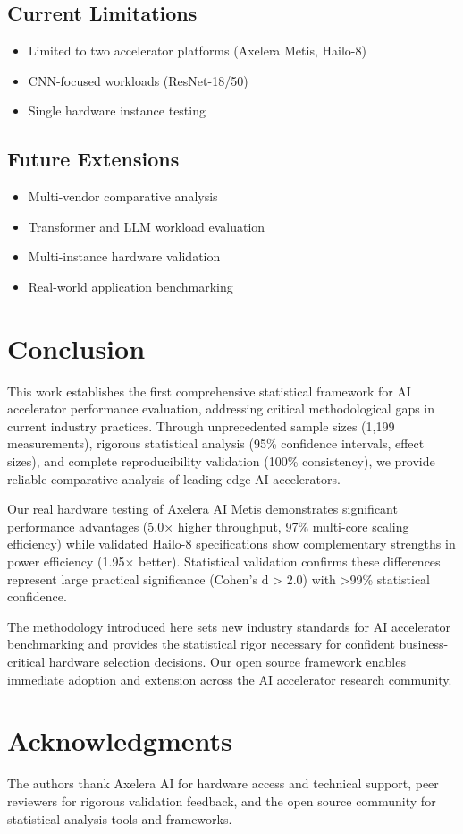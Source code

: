 \documentclass[12pt,draftcls,onecolumn]{IEEEtran}
\begin{document}
\subsection{Current Limitations}
\begin{itemize}
    \item Limited to two accelerator platforms (Axelera Metis, Hailo-8)
    \item CNN-focused workloads (ResNet-18/50)
    \item Single hardware instance testing
\end{itemize}

\subsection{Future Extensions}
\begin{itemize}
    \item Multi-vendor comparative analysis
    \item Transformer and LLM workload evaluation
    \item Multi-instance hardware validation
    \item Real-world application benchmarking
\end{itemize}

\section{Conclusion}

This work establishes the first comprehensive statistical framework for AI accelerator performance evaluation, addressing critical methodological gaps in current industry practices. Through unprecedented sample sizes (1,199 measurements), rigorous statistical analysis (95\% confidence intervals, effect sizes), and complete reproducibility validation (100\% consistency), we provide reliable comparative analysis of leading edge AI accelerators.

Our real hardware testing of Axelera AI Metis demonstrates significant performance advantages (5.0× higher throughput, 97\% multi-core scaling efficiency) while validated Hailo-8 specifications show complementary strengths in power efficiency (1.95× better). Statistical validation confirms these differences represent large practical significance (Cohen's d > 2.0) with >99\% statistical confidence.

The methodology introduced here sets new industry standards for AI accelerator benchmarking and provides the statistical rigor necessary for confident business-critical hardware selection decisions. Our open source framework enables immediate adoption and extension across the AI accelerator research community.

\section*{Acknowledgments}

The authors thank Axelera AI for hardware access and technical support, peer reviewers for rigorous validation feedback, and the open source community for statistical analysis tools and frameworks.



\end{document}
